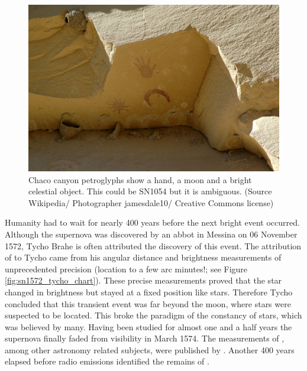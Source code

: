 \begin{figure}[tb] %
   \centering
   \includegraphics[width=\textwidth]{chapter_intro/plots/Chaco_canyon_pueblo_bonito_petroglyphs.jpg} 
   \caption[Chaco canyon petroglyphs]{Chaco canyon petroglyphs show a hand, a moon and a bright celestial object. This could be SN1054 but it is ambiguous. (Source Wikipedia/ Photographer jamesdale10/ Creative Commons license)}
   \label{fig:sn1006_chaco}
\end{figure}

Humanity had to wait for nearly 400 years before the next bright event occurred. Although the supernova was discovered by an abbot in Messina on 06 November 1572, Tycho Brahe is often attributed the discovery of this event. The attribution of  to Tycho came from his angular distance and brightness measurements of unprecedented precision (location to a few arc minutes!; see Figure \ref{fig:sn1572_tycho_chart}). These precise measurements proved that the star changed in brightness but stayed at a fixed position like stars. Therefore Tycho concluded that this transient event was far beyond the moon, where stars were suspected to be located. This broke the paradigm of the constancy of stars, which was believed by many. Having been studied for almost one and a half years the supernova finally faded from visibility in March 1574. The measurements of , among other astronomy related subjects, were published by \cite{1602QB41.B73.......}. Another 400 years elapsed before radio emissions identified the remains of  \citep{1952Natur.170..364H}.


